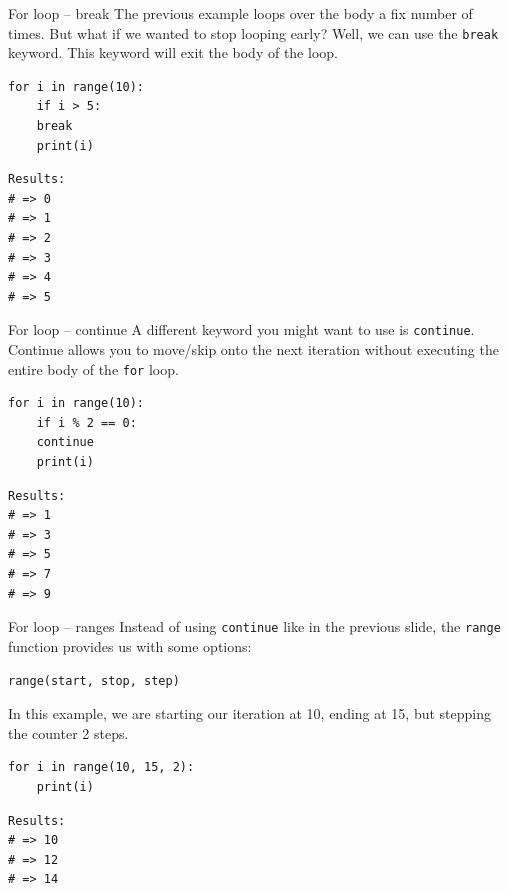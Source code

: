 \documentclass[10pt]{beamer}
\begin{document}
\begin{frame}[label={sec:orgea66675},fragile]{For loop -- break}
 The previous example loops over the body a fix number of times. But what if we wanted
to stop looping early? Well, we can use the \texttt{break} keyword. This keyword will exit the
body of the loop.

\begin{verbatim}
for i in range(10):
    if i > 5:
	break
    print(i)
\end{verbatim}

\begin{verbatim}
Results: 
# => 0
# => 1
# => 2
# => 3
# => 4
# => 5
\end{verbatim}
\end{frame}

\begin{frame}[label={sec:org41eb223},fragile]{For loop -- continue}
 A different keyword you might want to use is \texttt{continue}. Continue allows you to move/skip
onto the next iteration without executing the entire body of the \texttt{for} loop.

\begin{verbatim}
for i in range(10):
    if i % 2 == 0:
	continue
    print(i)
\end{verbatim}

\begin{verbatim}
Results: 
# => 1
# => 3
# => 5
# => 7
# => 9
\end{verbatim}
\end{frame}

\begin{frame}[label={sec:org7f367da},fragile]{For loop -- ranges}
 Instead of using \texttt{continue} like in the previous slide, the \texttt{range} function provides us
with some options:

\texttt{range(start, stop, step)}

In this example, we are starting our iteration at 10, ending at 15, but stepping the
counter 2 steps.

\begin{verbatim}
for i in range(10, 15, 2):
    print(i)
\end{verbatim}

\begin{verbatim}
Results: 
# => 10
# => 12
# => 14
\end{verbatim}
\end{frame}
\end{document}
